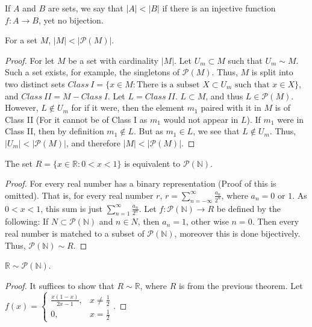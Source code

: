 \documentclass[crop=false,class=book,oneside]{standalone}
\begin{document}
            \begin{definition}
            If $A$ and $B$ are sets, we say that $|A|<|B|$ if there is an injective function $f:A\rightarrow B$, yet no bijection.
            \end{definition}
            \begin{theorem}
            For a set $M$, $|M|<|\mathcal{P}(M)|$.
            \end{theorem}
            \begin{proof}
            For let $M$ be a set with cardinality $|M|$. Let $U_m \subset M$ such that $U_m \sim M$. Such a set exists, for example, the singletons of $\mathcal{P}(M)$. Thus, $M$ is split into two distinct sets $Class\ I=\{x\in M: \textrm{There is a subset } X\subset U_m\textrm{ such that }x\in X\}$, and $Class\ II=M-Class\ I$. Let $L = Class\ II$. $L\subset M$, and thus $L\in \mathcal{P}(M)$. However, $L \notin U_m$ for if it were, then the element $m_1$ paired with it in $M$ is of Class II (For it cannot be of Class I as $m_1$ would not appear in $L$). If $m_1$ were in Class II, then by definition $m_1 \notin L$. But as $m_1 \in L$, we see that $L\notin U_m$. Thus, $|U_m| <|\mathcal{P}(M)|$, and therefore $|M|<|\mathcal{P}(M)|$.
            \end{proof}
            \begin{theorem}
            The set $R=\{x\in \mathbb{R}:0<x<1\}$ is equivalent to $\mathcal{P}(\mathbb{N})$.
            \end{theorem}
            \begin{proof}
            For every real number has a binary representation (Proof of this is omitted). That is, for every real number $r$, $ r = \sum_{n=-\infty}^{\infty} \frac{a_n}{2^n}$, where $a_n = 0$ or $1$. As $0<x<1$, this sum is just $\sum_{n=1}^{\infty} \frac{a_n}{2^n}$. Let $f:\mathcal{P}(\mathbb{N})\rightarrow R$ be defined by the following: If $N\subset \mathcal{P}(\mathbb{N})$ and $n\in N$, then $a_n = 1$, other wise $n=0$. Then every real number is matched to a subset of $\mathcal{P}(\mathbb{N})$, moreover this is done bijectively. Thus, $\mathcal{P}(\mathbb{N})\sim R$.
            \end{proof}
            \begin{theorem}
            $\mathbb{R} \sim \mathcal{P}(\mathbb{N})$.
            \end{theorem}
            \begin{proof}
            It suffices to show that $R\sim \mathbb{R}$, where $R$ is from the previous theorem. Let $f(x) = \begin{cases} \frac{x(1-x)}{2x-1}, & x \ne \frac{1}{2} \\ 0, & x = \frac{1}{2}\end{cases}$.
            \end{proof}
\end{document}
